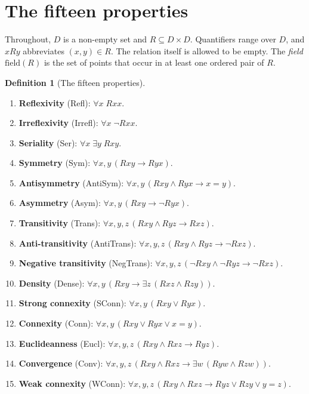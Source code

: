 \documentclass[11pt,a4paper,reqno]{amsart}
\theoremstyle{definition}
\newtheorem{definition}[proposition]{Definition}
\theoremstyle{remark}
\newcommand{\field}{\mathrm{field}}
\newcommand{\pabbr}[1]{\textsf{#1}}
\begin{document}
\section{The fifteen properties}

Throughout, $D$ is a non-empty set and $R\subseteq D\times D$.  Quantifiers
range over $D$, and $xRy$ abbreviates $(x,y)\in R$.  The relation itself is
allowed to be empty.  The \emph{field} $\field(R)$ is the set of points that
occur in at least one ordered pair of $R$.

\begin{definition}[The fifteen properties]\label{def:properties}
\leavevmode
\begin{enumerate}[label=\textbf{P\arabic*},leftmargin=2.5em,noitemsep]
  \item \textbf{Reflexivity} (\pabbr{Refl}): $\forall x\;Rxx$.
  \item \textbf{Irreflexivity} (\pabbr{Irrefl}): $\forall x\;\neg Rxx$.
  \item \textbf{Seriality} (\pabbr{Ser}): $\forall x\;\exists y\;Rxy$.
  \item \textbf{Symmetry} (\pabbr{Sym}): $\forall x,y\,(Rxy\to Ryx)$.
  \item \textbf{Antisymmetry} (\pabbr{AntiSym}): $\forall x,y\,(Rxy\wedge Ryx\to x=y)$.
  \item \textbf{Asymmetry} (\pabbr{Asym}): $\forall x,y\,(Rxy\to\neg Ryx)$.
  \item \textbf{Transitivity} (\pabbr{Trans}): $\forall x,y,z\,(Rxy\wedge Ryz\to Rxz)$.
  \item \textbf{Anti-transitivity} (\pabbr{AntiTrans}): $\forall x,y,z\,(Rxy\wedge Ryz\to\neg Rxz)$.
  \item \textbf{Negative transitivity} (\pabbr{NegTrans}): $\forall x,y,z\,(\neg Rxy\wedge\neg Ryz\to\neg Rxz)$.
  \item \textbf{Density} (\pabbr{Dense}): $\forall x,y\,(Rxy\to\exists z\,(Rxz\wedge Rzy))$.
  \item \textbf{Strong connexity} (\pabbr{SConn}): $\forall x,y\,(Rxy\vee Ryx)$.
  \item \textbf{Connexity} (\pabbr{Conn}): $\forall x,y\,(Rxy\vee Ryx\vee x=y)$.
  \item \textbf{Euclideanness} (\pabbr{Eucl}): $\forall x,y,z\,(Rxy\wedge Rxz\to Ryz)$.
  \item \textbf{Convergence} (\pabbr{Conv}): $\forall x,y,z\,(Rxy\wedge Rxz\to\exists w\,(Ryw\wedge Rzw))$.
  \item \textbf{Weak connexity} (\pabbr{WConn}): $\forall x,y,z\,(Rxy\wedge Rxz\to Ryz\vee Rzy\vee y=z)$.
\end{enumerate}
\end{definition}
\end{document}
